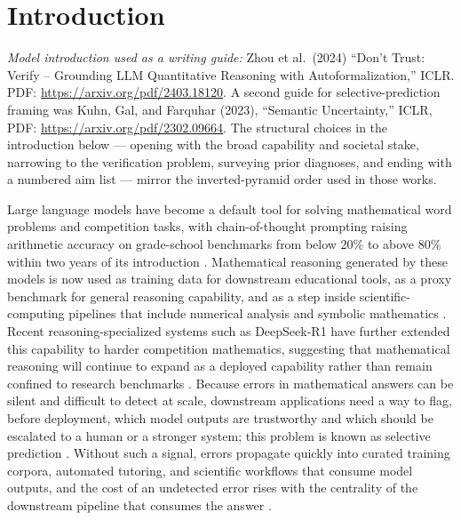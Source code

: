 \documentclass[11pt]{article}
\begin{document}
\section{Introduction}

\noindent
{\small\textit{Model introduction used as a writing guide:} Zhou et al.\ (2024) ``Don't Trust: Verify -- Grounding LLM Quantitative Reasoning with Autoformalization,'' ICLR. PDF: \url{https://arxiv.org/pdf/2403.18120}. A second guide for selective-prediction framing was Kuhn, Gal, and Farquhar (2023), ``Semantic Uncertainty,'' ICLR, PDF: \url{https://arxiv.org/pdf/2302.09664}. The structural choices in the introduction below --- opening with the broad capability and societal stake, narrowing to the verification problem, surveying prior diagnoses, and ending with a numbered aim list --- mirror the inverted-pyramid order used in those works.\par}
\medskip

Large language models have become a default tool for solving mathematical word problems and competition tasks, with chain-of-thought prompting raising arithmetic accuracy on grade-school benchmarks from below 20\% to above 80\% within two years of its introduction \citep{wei2022cot, cobbe2021gsm8k}. Mathematical reasoning generated by these models is now used as training data for downstream educational tools, as a proxy benchmark for general reasoning capability, and as a step inside scientific-computing pipelines that include numerical analysis and symbolic mathematics \citep{hendrycks2021math, lightman2024prm}. Recent reasoning-specialized systems such as DeepSeek-R1 have further extended this capability to harder competition mathematics, suggesting that mathematical reasoning will continue to expand as a deployed capability rather than remain confined to research benchmarks \citep{deepseek2025r1, mathshepherd2024}. Because errors in mathematical answers can be silent and difficult to detect at scale, downstream applications need a way to flag, before deployment, which model outputs are trustworthy and which should be escalated to a human or a stronger system; this problem is known as selective prediction \citep{kuhn2023semantic, farquhar2024nature}. Without such a signal, errors propagate quickly into curated training corpora, automated tutoring, and scientific workflows that consume model outputs, and the cost of an undetected error rises with the centrality of the downstream pipeline that consumes the answer \citep{ste2024, processbench2024, reasoneval2024}.
\end{document}

